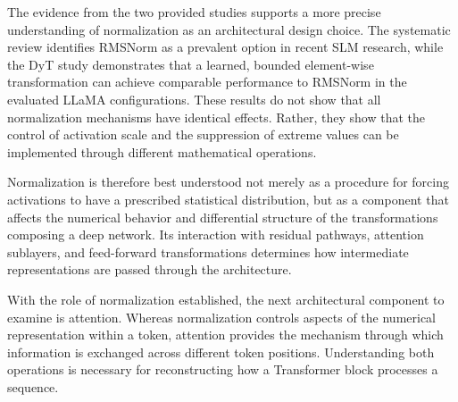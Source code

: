 The evidence from the two provided studies supports a more precise
understanding of normalization as an architectural design choice.
The systematic review identifies RMSNorm as a prevalent option in
recent SLM research, while the DyT study demonstrates that a learned,
bounded element-wise transformation can achieve comparable performance
to RMSNorm in the evaluated LLaMA configurations. These results do not
show that all normalization mechanisms have identical effects. Rather,
they show that the control of activation scale and the suppression of
extreme values can be implemented through different mathematical
operations.

Normalization is therefore best understood not merely as a procedure
for forcing activations to have a prescribed statistical distribution,
but as a component that affects the numerical behavior and
differential structure of the transformations composing a deep
network. Its interaction with residual pathways, attention sublayers,
and feed-forward transformations determines how intermediate
representations are passed through the architecture.

With the role of normalization established, the next architectural
component to examine is attention. Whereas normalization controls
aspects of the numerical representation within a token, attention
provides the mechanism through which information is exchanged across
different token positions. Understanding both operations is necessary
for reconstructing how a Transformer block processes a sequence.
